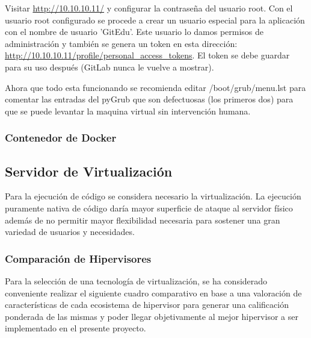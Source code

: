 Visitar \url{http://10.10.10.11/} y configurar la contraseña del usuario root. Con el usuario root configurado se procede a crear un usuario especial para la aplicación con el nombre de usuario 'GitEdu'. Este usuario lo damos permisos de administración y también se genera un token en esta dirección: \url{http://10.10.10.11/profile/personal_access_tokens}. El token se debe guardar para su uso después (GitLab nunca le vuelve a mostrar).

Ahora que todo esta funcionando se recomienda editar /boot/grub/menu.lst para comentar las entradas del pyGrub que son defectuosas (los primeros dos) para que se puede levantar la maquina virtual sin intervención humana.

\subsubsection{Contenedor de Docker}

\subsection{Servidor de Virtualización}
Para la ejecución de código se considera necesario la virtualización. La ejecución puramente nativa de código daría mayor superficie de ataque al servidor físico además de no permitir mayor flexibilidad necesaria para sostener una gran variedad de usuarios y necesidades.

\subsubsection{Comparación de Hipervisores}
Para la selección de una tecnología de virtualización, se ha considerado conveniente realizar el siguiente cuadro comparativo en base a una valoración de características de cada ecosistema de hipervisor para generar una calificación ponderada de las mismas y poder llegar objetivamente al mejor hipervisor a ser implementado en el presente proyecto.

